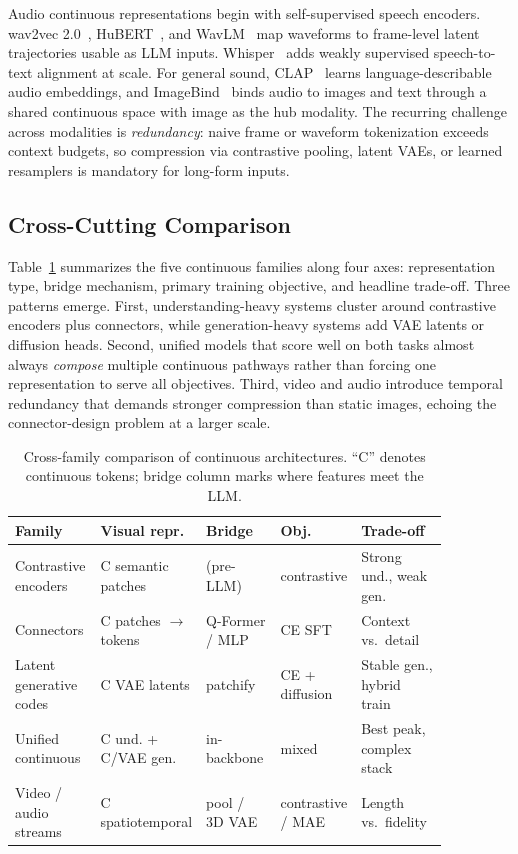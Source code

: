 Audio continuous representations begin with self-supervised speech encoders. wav2vec 2.0~\cite{baevski2020wav2vec}, HuBERT~\cite{hsu2021hubert}, and WavLM~\cite{chen2022wavlm} map waveforms to frame-level latent trajectories usable as LLM inputs. Whisper~\cite{radford2023whisper} adds weakly supervised speech-to-text alignment at scale. For general sound, CLAP~\cite{elizalde2023clap} learns language-describable audio embeddings, and ImageBind~\cite{girdhar2023imagebind} binds audio to images and text through a shared continuous space with image as the hub modality. The recurring challenge across modalities is \emph{redundancy}: naive frame or waveform tokenization exceeds context budgets, so compression via contrastive pooling, latent VAEs, or learned resamplers is mandatory for long-form inputs.

\subsection{Cross-Cutting Comparison}
\label{subsec:continuous-comparison}

Table~\ref{tab:continuous-compare} summarizes the five continuous families along four axes: representation type, bridge mechanism, primary training objective, and headline trade-off. Three patterns emerge. First, understanding-heavy systems cluster around contrastive encoders plus connectors, while generation-heavy systems add VAE latents or diffusion heads. Second, unified models that score well on both tasks almost always \emph{compose} multiple continuous pathways rather than forcing one representation to serve all objectives. Third, video and audio introduce temporal redundancy that demands stronger compression than static images, echoing the connector-design problem at a larger scale.

\begin{table}[t]
  \caption{Cross-family comparison of continuous architectures. ``C'' denotes continuous tokens; bridge column marks where features meet the LLM.}
  \label{tab:continuous-compare}
  \small
  \setlength{\tabcolsep}{4pt}
  \begin{tabular}{@{}p{0.20\linewidth}p{0.16\linewidth}p{0.18\linewidth}p{0.10\linewidth}p{0.22\linewidth}@{}}
    \toprule
    Family & Visual repr. & Bridge & Obj. & Trade-off \\
    \midrule
    Contrastive encoders  & C semantic patches     & (pre-LLM)      & contrastive & Strong und., weak gen. \\
    Connectors            & C patches $\to$ tokens & Q-Former / MLP & CE SFT      & Context vs.\ detail \\
    Latent generative codes & C VAE latents        & patchify       & CE + diffusion & Stable gen., hybrid train \\
    Unified continuous    & C und. + C/VAE gen.  & in-backbone    & mixed       & Best peak, complex stack \\
    Video / audio streams & C spatiotemporal     & pool / 3D VAE  & contrastive / MAE & Length vs.\ fidelity \\
    \bottomrule
  \end{tabular}
\end{table}


